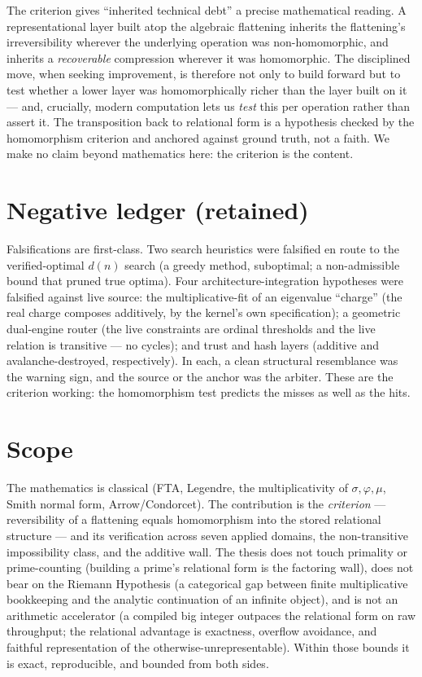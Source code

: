 \documentclass[11pt]{article}
\begin{document}
The criterion gives ``inherited technical debt'' a precise mathematical reading. A representational layer
built atop the algebraic flattening inherits the flattening's irreversibility wherever the underlying
operation was non-homomorphic, and inherits a \emph{recoverable} compression wherever it was homomorphic. The
disciplined move, when seeking improvement, is therefore not only to build forward but to test whether a
lower layer was homomorphically richer than the layer built on it --- and, crucially, modern computation lets
us \emph{test} this per operation rather than assert it. The transposition back to relational form is a
hypothesis checked by the homomorphism criterion and anchored against ground truth, not a faith. We make no
claim beyond mathematics here: the criterion is the content.

\section{Negative ledger (retained)}

Falsifications are first-class. Two search heuristics were falsified en route to the verified-optimal
$d(n)$ search (a greedy method, suboptimal; a non-admissible bound that pruned true optima). Four
architecture-integration hypotheses were falsified against live source: the multiplicative-fit of an
eigenvalue ``charge'' (the real charge composes additively, by the kernel's own specification); a
geometric dual-engine router (the live constraints are ordinal thresholds and the live relation is
transitive --- no cycles); and trust and hash layers (additive and avalanche-destroyed, respectively). In
each, a clean structural resemblance was the warning sign, and the source or the anchor was the arbiter.
These are the criterion working: the homomorphism test predicts the misses as well as the hits.

\section{Scope}

The mathematics is classical (FTA, Legendre, the multiplicativity of $\sigma,\varphi,\mu$, Smith normal
form, Arrow/Condorcet). The contribution is the \emph{criterion} --- reversibility of a flattening equals
homomorphism into the stored relational structure --- and its verification across seven applied domains, the
non-transitive impossibility class, and the additive wall. The thesis does not touch primality or
prime-counting (building a prime's relational form is the factoring wall), does not bear on the Riemann
Hypothesis (a categorical gap between finite multiplicative bookkeeping and the analytic continuation of an
infinite object), and is not an arithmetic accelerator (a compiled big integer outpaces the relational form
on raw throughput; the relational advantage is exactness, overflow avoidance, and faithful representation of
the otherwise-unrepresentable). Within those bounds it is exact, reproducible, and bounded from both sides.
\end{document}
